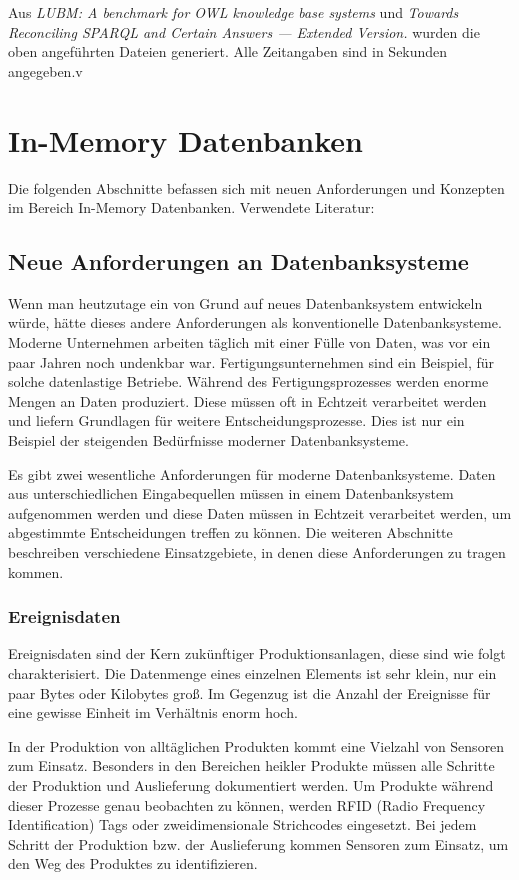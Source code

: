 \documentclass[draft,final]{vutinfth} %
\begin{document}
Aus \textit{LUBM: A benchmark for OWL knowledge base systems} \cite{Guo2005158} und \textit{Towards Reconciling {SPARQL} and Certain Answers --- Extended Version.} \cite{ahmetaj2015wwwext} wurden die oben angeführten Dateien generiert.
Alle Zeitangaben sind in Sekunden angegeben.v

\chapter{In-Memory Datenbanken} \label{inMemoryDatenbanken}
Die folgenden Abschnitte befassen sich mit neuen Anforderungen und Konzepten im Bereich In-Memory Datenbanken. Verwendete Literatur: \cite{BookInMem}
\section{Neue Anforderungen an Datenbanksysteme}
Wenn man heutzutage ein von Grund auf neues Datenbanksystem entwickeln würde, hätte dieses andere Anforderungen als konventionelle Datenbanksysteme. Moderne Unternehmen arbeiten täglich mit einer Fülle von Daten, was vor ein paar Jahren noch undenkbar war. Fertigungsunternehmen sind ein Beispiel, für solche datenlastige Betriebe. Während des Fertigungsprozesses werden enorme Mengen an Daten produziert. Diese müssen oft in Echtzeit verarbeitet werden und liefern Grundlagen für weitere Entscheidungsprozesse. Dies ist nur ein Beispiel der steigenden Bedürfnisse moderner Datenbanksysteme. 

Es gibt zwei wesentliche Anforderungen für moderne Datenbanksysteme. Daten aus unterschiedlichen Eingabequellen müssen in einem Datenbanksystem aufgenommen werden und diese Daten müssen in Echtzeit verarbeitet werden, um abgestimmte Entscheidungen treffen zu können. Die weiteren Abschnitte beschreiben verschiedene Einsatzgebiete, in denen diese Anforderungen zu tragen kommen.

\subsection*{Ereignisdaten}
Ereignisdaten sind der Kern zukünftiger Produktionsanlagen, diese sind wie folgt charakterisiert. Die Datenmenge eines einzelnen Elements ist sehr klein, nur ein paar Bytes oder Kilobytes gro\ss . Im Gegenzug ist die Anzahl der Ereignisse für eine gewisse Einheit im Verhältnis enorm hoch. 

In der Produktion von alltäglichen Produkten kommt eine Vielzahl von Sensoren zum Einsatz. Besonders in den Bereichen heikler Produkte müssen alle Schritte der Produktion und Auslieferung dokumentiert werden. Um Produkte während dieser Prozesse genau beobachten zu können, werden RFID (Radio Frequency Identification) Tags oder zweidimensionale Strichcodes eingesetzt. Bei jedem Schritt der Produktion bzw. der Auslieferung kommen Sensoren zum Einsatz, um den Weg des Produktes zu identifizieren. 
\end{document}
